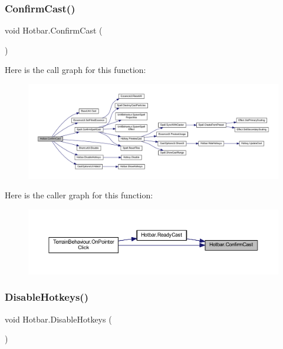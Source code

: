 \subsubsection{\texorpdfstring{ConfirmCast()}{ConfirmCast()}}
{\footnotesize\ttfamily void Hotbar.\+Confirm\+Cast (\begin{DoxyParamCaption}{ }\end{DoxyParamCaption})}

Here is the call graph for this function\+:\nopagebreak
\begin{figure}[H]
\begin{center}
\leavevmode
\includegraphics[width=350pt]{class_hotbar_a535ef71789d10c417b86bdd194e3e5b7_cgraph}
\end{center}
\end{figure}
Here is the caller graph for this function\+:\nopagebreak
\begin{figure}[H]
\begin{center}
\leavevmode
\includegraphics[width=350pt]{class_hotbar_a535ef71789d10c417b86bdd194e3e5b7_icgraph}
\end{center}
\end{figure}
\mbox{\label{class_hotbar_a914ca0c61c4d64b0bde6e829064f71a9}} 
\subsubsection{\texorpdfstring{DisableHotkeys()}{DisableHotkeys()}}
{\footnotesize\ttfamily void Hotbar.\+Disable\+Hotkeys (\begin{DoxyParamCaption}{ }\end{DoxyParamCaption})}

